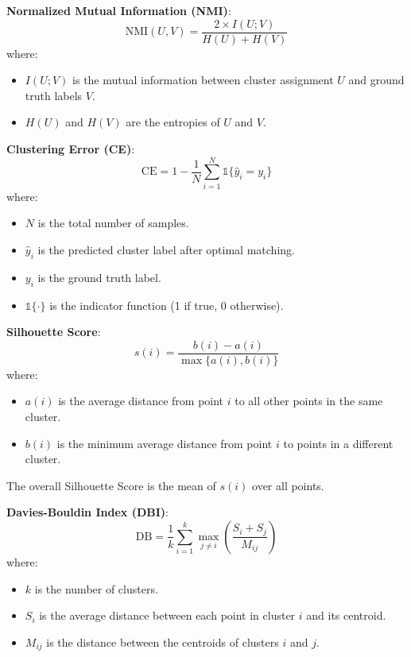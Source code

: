 \documentclass[
	10pt,
	parskip=half-,	
	paper=a4,
	english
	]{scrartcl}
\begin{document}
\vspace{0.5cm}
\textbf{Normalized Mutual Information (NMI)}:
\begin{equation}
    \text{NMI}(U, V) = \frac{2 \times I(U; V)}{H(U) + H(V)}
    \label{eq9}
\end{equation}
where:
\begin{itemize}
    \item $I(U; V)$ is the mutual information between cluster assignment $U$ and ground truth labels $V$.
    \item $H(U)$ and $H(V)$ are the entropies of $U$ and $V$.
\end{itemize}

\vspace{0.5cm}
\textbf{Clustering Error (CE)}:
\begin{equation}
    \text{CE} = 1 - \frac{1}{N} \sum_{i=1}^{N} \mathbb{1}\{ \hat{y}_i = y_i \}
    \label{eq10}
\end{equation}
where:
\begin{itemize}
    \item $N$ is the total number of samples.
    \item $\hat{y}_i$ is the predicted cluster label after optimal matching.
    \item $y_i$ is the ground truth label.
    \item $\mathbb{1}\{\cdot\}$ is the indicator function (1 if true, 0 otherwise).
\end{itemize}

\vspace{0.5cm}
\textbf{Silhouette Score}:
\begin{equation}
    s(i) = \frac{b(i) - a(i)}{\max\{a(i), b(i)\}}
    \label{eq11}
\end{equation}
where:
\begin{itemize}
    \item $a(i)$ is the average distance from point $i$ to all other points in the same cluster.
    \item $b(i)$ is the minimum average distance from point $i$ to points in a different cluster.
\end{itemize}
The overall Silhouette Score is the mean of $s(i)$ over all points.

\vspace{0.5cm}
\textbf{Davies-Bouldin Index (DBI)}:
\begin{equation}
    \text{DB} = \frac{1}{k} \sum_{i=1}^{k} \max_{j \neq i} \left( \frac{S_i + S_j}{M_{ij}} \right)
    \label{eq12}
\end{equation}
where:
\begin{itemize}
    \item $k$ is the number of clusters.
    \item $S_i$ is the average distance between each point in cluster $i$ and its centroid.
    \item $M_{ij}$ is the distance between the centroids of clusters $i$ and $j$.
\end{itemize}
\end{document}
